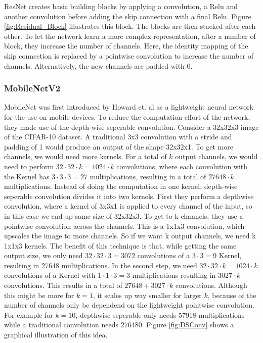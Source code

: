 ResNet creates basic building blocks by applying a convolution, a Relu and
another convolution before adding the skip connection with a final Relu. Figure
\ref{fig:Residual_Block} illustrates this block. The blocks are then stacked
after each other. To let the network learn a more complex representation, after
a number of block, they increase the number of channels. Here, the identity
mapping of the skip connection is replaced by a pointwise convolution to
increase the number of channels. Alternatively, the new channels are padded with
0.



\subsubsection{MobileNetV2}\label{sub:MobileNetV2}
MobileNet was first introduced by Howard et. al \cite{howard2017mobilenets} as a
lightweight neural network for the use on mobile devices. To reduce the
computation effort of the network, they made use of the depth-wise seperable
convolution. Consider a 32x32x3 image of the CIFAR-10 dataset. A traditional 3x3
convolution with a stride and padding of 1 would produce an output of the shape
32x32x1. To get more channels, we would need more kernels. For a total of $k$
output channels, we would need to perform $32\cdot 32 \cdot k=1024\cdot k$
convolutions, where each convolution with the Kernel has $3\cdot 3 \cdot 3=27$
multiplications, resulting in a total of $27648\cdot k$ multiplications.
Instead of doing the computation in one kernel, depth-wise seperable convolution
divides it into two kernels. First they perform a depthwise convolution, where a
kernel of 3x3x1 is applied to every channel of the input, so in this case we end
up same size of 32x32x3. To get to k channels, they use a pointwise convolution
across the channels. This is a 1x1x3 convolution, which upscales the image to
more channels. So if we want k output channels, we need k 1x1x3 kernels. The
benefit of this technique is that, while getting the same output size, we only
need $32\cdot 32 \cdot 3=3072$ convolutions of a $3\cdot 3=9$ Kernel, resulting
in 27648 multiplications. In the second step, we need $32\cdot 32\cdot
k=1024\cdot k$ convolutions of a Kernel with $1\cdot 1\cdot 3=3$ multiplications
resulting in $3027\cdot k$ convolutions. This results in a total of $27648 +
3027\cdot k$ convolutions. Although this might be more for $k=1$, it scales up
way smaller for larger $k$, because of the number of channels only be dependend
on the lightweight pointwise convolution. For example for $k=10$, depthwise
seperable only needs 57918 multiplications while a traditional convolution needs
276480. Figure \ref{fig:DSConv} shows a graphical illustration of this idea.


